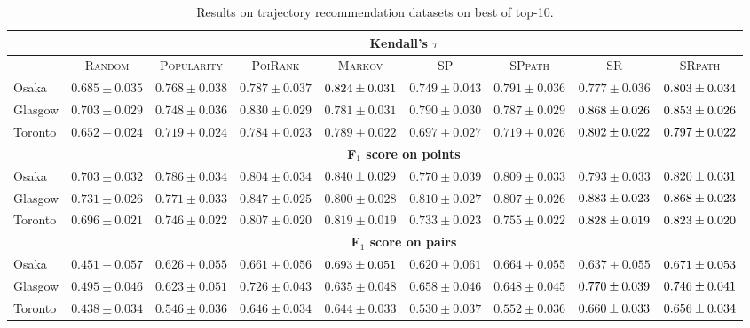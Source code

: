 \begin{table*}[!h]
\centering
\small
\setlength{\tabcolsep}{3pt} %
\begin{tabular}{l|cc|ccc|ccc} \hline
& \multicolumn{8}{c}{\bf Kendall's $\tau$} \\ \hline
 & \textsc{Random} & \textsc{Popularity} & \textsc{PoiRank} & \textsc{Markov} & \textsc{SP} & \textsc{SPpath} & \textsc{SR} & \textsc{SRpath} \\ \hline
Osaka & $0.685\pm0.035$ & $0.768\pm0.038$ & $0.787\pm0.037$ & $\cellcolor{green!25}{0.824\pm0.031}$ & $0.749\pm0.043$ & $0.791\pm0.036$ & $0.777\pm0.036$ & $\cellcolor{yellow!25}{0.803\pm0.034}$ \\
Glasgow & $0.703\pm0.029$ & $0.748\pm0.036$ & $0.830\pm0.029$ & $0.781\pm0.031$ & $0.790\pm0.030$ & $0.787\pm0.029$ & $\cellcolor{green!25}{0.868\pm0.026}$ & $\cellcolor{yellow!25}{0.853\pm0.026}$ \\
Toronto & $0.652\pm0.024$ & $0.719\pm0.024$ & $0.784\pm0.023$ & $0.789\pm0.022$ & $0.697\pm0.027$ & $0.719\pm0.026$ & $\cellcolor{green!25}{0.802\pm0.022}$ & $\cellcolor{yellow!25}{0.797\pm0.022}$ \\
\hline
& \multicolumn{8}{c}{\bf F$_1$ score on points} \\ \hline
Osaka & $0.703\pm0.032$ & $0.786\pm0.034$ & $0.804\pm0.034$ & $\cellcolor{green!25}{0.840\pm0.029}$ & $0.770\pm0.039$ & $0.809\pm0.033$ & $0.793\pm0.033$ & $\cellcolor{yellow!25}{0.820\pm0.031}$ \\
Glasgow & $0.731\pm0.026$ & $0.771\pm0.033$ & $0.847\pm0.025$ & $0.800\pm0.028$ & $0.810\pm0.027$ & $0.807\pm0.026$ & $\cellcolor{green!25}{0.883\pm0.023}$ & $\cellcolor{yellow!25}{0.868\pm0.023}$ \\
Toronto & $0.696\pm0.021$ & $0.746\pm0.022$ & $0.807\pm0.020$ & $0.819\pm0.019$ & $0.733\pm0.023$ & $0.755\pm0.022$ & $\cellcolor{green!25}{0.828\pm0.019}$ & $\cellcolor{yellow!25}{0.823\pm0.020}$ \\
\hline
& \multicolumn{8}{c}{\bf F$_1$ score on pairs} \\ \hline
Osaka & $0.451\pm0.057$ & $0.626\pm0.055$ & $0.661\pm0.056$ & $\cellcolor{green!25}{0.693\pm0.051}$ & $0.620\pm0.061$ & $0.664\pm0.055$ & $0.637\pm0.055$ & $\cellcolor{yellow!25}{0.671\pm0.053}$ \\
Glasgow & $0.495\pm0.046$ & $0.623\pm0.051$ & $0.726\pm0.043$ & $0.635\pm0.048$ & $0.658\pm0.046$ & $0.648\pm0.045$ & $\cellcolor{green!25}{0.770\pm0.039}$ & $\cellcolor{yellow!25}{0.746\pm0.041}$ \\
Toronto & $0.438\pm0.034$ & $0.546\pm0.036$ & $0.646\pm0.034$ & $0.644\pm0.033$ & $0.530\pm0.037$ & $0.552\pm0.036$ & $\cellcolor{green!25}{0.660\pm0.033}$ & $\cellcolor{yellow!25}{0.656\pm0.034}$ \\
\hline
\end{tabular}
\caption{Results on trajectory recommendation datasets on best of top-10.}
\end{table*}
